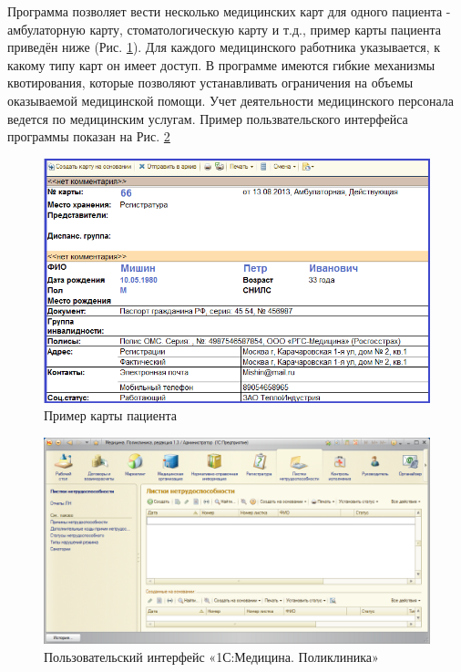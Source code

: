\documentclass[14pt,a4paper,russian]{extreport}
\begin{document}
Программа позволяет вести несколько медицинских карт для одного пациента - амбулаторную карту,
стоматологическую карту и т.д., пример карты пациента приведён ниже (Рис. \ref{fig:pc}). Для каждого медицинского работника указывается, к какому типу карт
он имеет доступ. В программе имеются гибкие механизмы квотирования, которые позволяют устанавливать
ограничения на объемы оказываемой медицинской помощи. Учет деятельности медицинского персонала
ведется по медицинским услугам. Пример пользвательского интерфейса программы показан на
Рис. \ref{fig:1c}
\begin{figure}[t!]
        \includegraphics[width=\textwidth]{patientcard}
        \caption{Пример карты пациента}
        \label{fig:pc}
\end{figure}
\par
\begin{figure}[h!]
        \includegraphics[width=\textwidth]{1cinterface}
        \caption{Пользовательский интерфейс «1С:Медицина. Поликлиника»}
        \label{fig:1c}
\end{figure}
\end{document}

